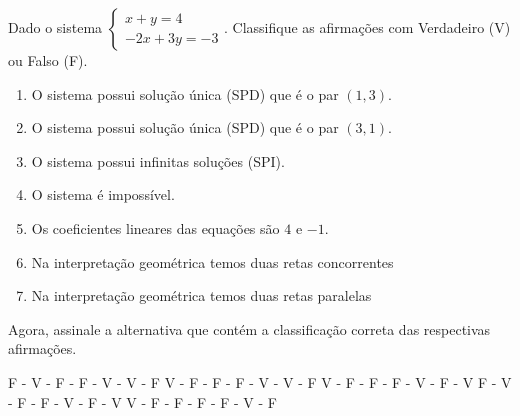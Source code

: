 Dado o sistema $\left\{ \begin{array}{l}
x+y=4\\
-2x+3y=-3
\end{array} \right.$. Classifique as afirmações com Verdadeiro (V) ou Falso (F).
\begin{enumerate}[(\quad)]
\item O sistema possui solução única (SPD) que é o par $(1,3)$.
\item O sistema possui solução única (SPD) que é o par $(3,1)$.
\item O sistema possui infinitas soluções (SPI).
\item O sistema é impossível.
\item Os coeficientes lineares das equações são $4$ e $-1$.
\item Na interpretação geométrica temos duas retas concorrentes
\item Na interpretação geométrica temos duas retas paralelas
\end{enumerate}
Agora, assinale a alternativa que contém a classificação correta das respectivas afirmações.

F - V - F - F - V - V - F
V - F - F - F - V - V - F
V - F - F - F - V - F - V
F - V - F - F - V - F - V
V - F - F - F - F - V - F


